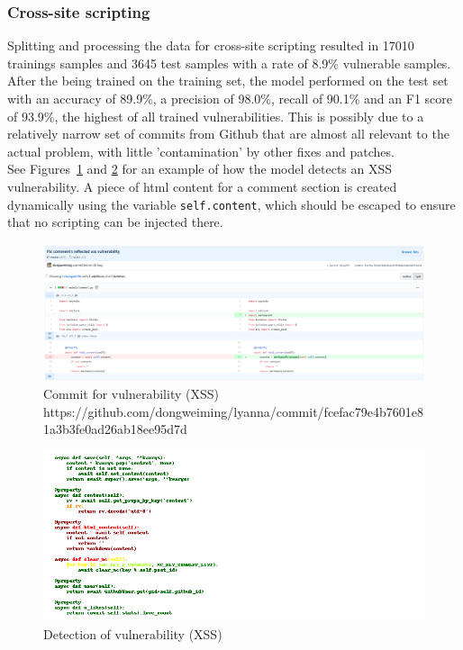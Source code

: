 \documentclass[
a4paper,
pagesize,
pdftex,
12pt,
twoside, %
BCOR=5mm, %
ngerman,
fleqn,
final,
]{scrartcl}
\begin{document}
	
	\subsubsection{Cross-site scripting}
	Splitting and processing the data for cross-site scripting resulted in 17010 trainings samples and 3645 test samples with a rate of 8.9\% vulnerable samples. After the being trained on the training set, the model performed on the test set with an accuracy of 89.9\%, a precision of 98.0\%, recall of 90.1\% and an F1 score of 93.9\%, the highest of all trained vulnerabilities. This is possibly due to a relatively narrow set of commits from Github that are almost all relevant to the actual problem, with little 'contamination' by other fixes and patches.\\
	See Figures~\ref{fig:xssA} and \ref{fig:xssAr} for an example of how the model detects an XSS vulnerability. A piece of html content for a comment section is created dynamically using the variable \texttt{self.content}, which should be escaped to ensure that no scripting can be injected there.
	
	\begin{figure}[H]
		\centering
		\includegraphics[width=\linewidth]{Images/xssA}
		\caption{Commit for vulnerability (XSS) \newline \scriptsize{https://github.com/dongweiming/lyanna/commit/fcefac79e4b7601e81a3b3fe0ad26ab18ee95d7d}}
		\label{fig:xssA}
	\end{figure}
	\begin{figure}[H]
		\centering
		\includegraphics[width=\linewidth]{Images/xssAr}
		\caption{Detection of vulnerability (XSS)}
		\label{fig:xssAr}
	\end{figure}
	
\end{document}

